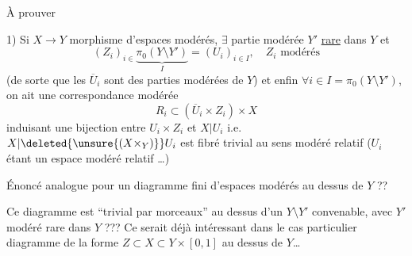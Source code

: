 À prouver

1) Si $X\to Y$ morphisme d'espaces modérés, $\exists$ partie modérée $Y'$ \uline{rare} dans $Y$ et
\[
(Z_i)_{i\in}\underbrace{\pi_0(Y\setminus Y')}_{I}=(U_i)_{i\in I},\quad Z_i\text{ modérés}
\]
(de sorte que les $\overline U_i$ sont des parties modérées de $Y$) et enfin $\forall i\in I=\pi_0(Y\setminus Y')$, on ait une correspondance modérée
\[
R_i\subset(\overline U_i\times Z_i)\times X
\]
induisant une bijection entre $U_i\times Z_i$ et $X|U_i$ i.e. $X|\deleted{\unsure{(X\times_Y)}}U_i$ est fibré  trivial au sens modéré relatif ($U_i$ étant un espace modéré relatif \ldots)

Énoncé analogue pour un diagramme fini d'espaces modérés au dessus de $Y$ ??

Ce diagramme est  ``trivial par morceaux'' au dessus d'un $Y\setminus Y'$ convenable, avec $Y'$ modéré rare dans $Y$ ??? Ce serait déjà intéressant dans le cas particulier  diagramme de la forme $Z\subset X\subset Y\times[0,1]$ \deleted{$\unsure{I\subset[0,}$} au dessus de $Y$\ldots

